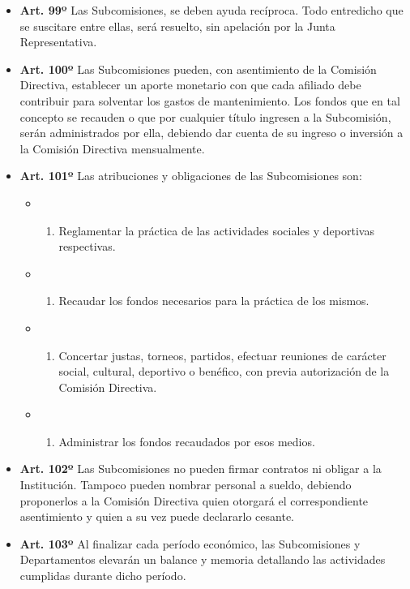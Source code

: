 \documentclass[]{book}
\providecommand{\tightlist}{%
  \setlength{\itemsep}{0pt}\setlength{\parskip}{0pt}}
\begin{document}
\begin{itemize}
\item
  \textbf{Art. 99º} Las Subcomisiones, se deben ayuda recíproca. Todo
  entredicho que se suscitare entre ellas, será resuelto, sin apelación
  por la Junta Representativa.
\item
  \textbf{Art. 100º} Las Subcomisiones pueden, con asentimiento de la
  Comisión Directiva, establecer un aporte monetario con que cada
  afiliado debe contribuir para solventar los gastos de mantenimiento.
  Los fondos que en tal concepto se recauden o que por cualquier título
  ingresen a la Subcomisión, serán administrados por ella, debiendo dar
  cuenta de su ingreso o inversión a la Comisión Directiva mensualmente.
\item
  \textbf{Art. 101º} Las atribuciones y obligaciones de las
  Subcomisiones son:

  \begin{itemize}
  \item
    \begin{enumerate}
    \def\labelenumi{\alph{enumi})}
    \tightlist
    \item
      Reglamentar la práctica de las actividades sociales y deportivas
      respectivas.
    \end{enumerate}
  \item
    \begin{enumerate}
    \def\labelenumi{\alph{enumi})}
    \setcounter{enumi}{1}
    \tightlist
    \item
      Recaudar los fondos necesarios para la práctica de los mismos.
    \end{enumerate}
  \item
    \begin{enumerate}
    \def\labelenumi{\alph{enumi})}
    \setcounter{enumi}{2}
    \tightlist
    \item
      Concertar justas, torneos, partidos, efectuar reuniones de
      carácter social, cultural, deportivo o benéfico, con previa
      autorización de la Comisión Directiva.
    \end{enumerate}
  \item
    \begin{enumerate}
    \def\labelenumi{\alph{enumi})}
    \setcounter{enumi}{3}
    \tightlist
    \item
      Administrar los fondos recaudados por esos medios.
    \end{enumerate}
  \end{itemize}
\item
  \textbf{Art. 102º} Las Subcomisiones no pueden firmar contratos ni
  obligar a la Institución. Tampoco pueden nombrar personal a sueldo,
  debiendo proponerlos a la Comisión Directiva quien otorgará el
  correspondiente asentimiento y quien a su vez puede declararlo
  cesante.
\item
  \textbf{Art. 103º} Al finalizar cada período económico, las
  Subcomisiones y Departamentos elevarán un balance y memoria detallando
  las actividades cumplidas durante dicho período.
\end{itemize}
\end{document}
